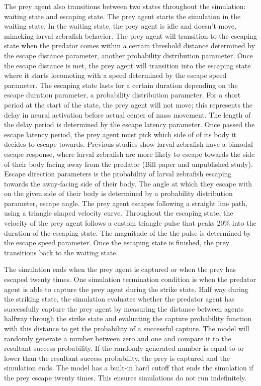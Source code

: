 \documentclass[]{rsos}%
\begin{document}
The prey agent also transitions between two states throughout the simulation: waiting state and escaping state. The prey agent starts the simulation in the waiting state. In the waiting state, the prey agent is idle and doesn’t move, mimcking larval zebrafish behavior. The prey agent will transition to the escaping state when the predator comes within a certain threshold distance determined by the escape distance parameter, another probability distribution parameter. Once the escape distance is met, the prey agent will transition into the escaping state where it starts locomoting with a speed determined by the escape speed parameter. The escaping state lasts for a certain duration depending on the escape duration parameter, a probability distribution parameter. For a short period at the start of the state, the prey agent will not move; this represents the delay in neural activation before actual center of mass movement. The length of the delay period is determined by the escape latency parameter. Once passed the escape latency period, the prey agent must pick which side of of its body it decides to escape towards. Previous studies show larval zebrafish have a bimodal escape response, where larval zebrafish are more likely to escape towards the side of their body facing away from the predator (Bill paper and unpublished study). Escape direction parameters is the probability of larval zebrafish escaping towards the away-facing side of their body. The angle at which they escape with on the given side of their body is determined by a probability distribution parameter, escape angle. The prey agent escapes following a straight line path, using a triangle shaped velocity curve. Throughout the escaping state, the velocity of the prey agent follows a custom triangle pulse that peaks 20\% into the duration of the escaping state. The magnitude of the the pulse is determined by the escape speed parameter. Once the escaping state is finished, the prey transitions back to the waiting state.

The simulation ends when the prey agent is captured or when the prey has escaped twenty times. One simulation termination condition is when the predator agent is able to capture the prey agent during the strike state. Half way during the striking state, the simulation evaluates whether the predator agent has successfully capture the prey agent by measuring the distance between agents halfway through the strike state and evaluating the capture probability function with this distance to get the probability of a successful capture. The model will randomly generate a number between zero and one and compare it to the resultant success probability. If the randomly generated number is equal to or lower than the resultant success probability, the prey is captured and the simulation ends. The model has a built-in hard cutoff that ends the simulation if the prey escape twenty times. This ensures simulations do not run indefinitely.
\end{document}
